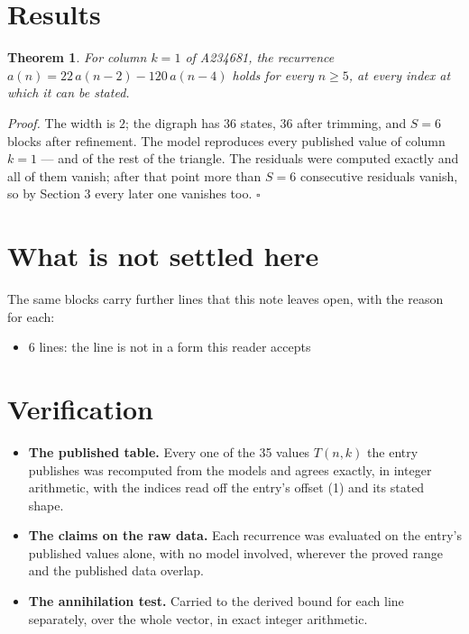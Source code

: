 \documentclass[11pt]{article}
\newtheorem{theorem}{Theorem}
\theoremstyle{definition}
\begin{document}
\section{Results}

\begin{theorem} For column $k = 1$ of A234681, the recurrence $a(n) = 22\,a(n-2) - 120\,a(n-4)$ holds for every $n \ge 5$, at every index at which it can be stated.\end{theorem}

{\itshape Proof.} The width is $2$; the digraph has $36$ states, $36$ after trimming, and $S = 6$ blocks after refinement. The model reproduces every published value of column $k = 1$ --- and of the rest of the triangle. The residuals were computed exactly and all of them vanish; after that point more than $S = 6$ consecutive residuals vanish, so by Section 3 every later one vanishes too. $\square$

\section{What is not settled here}

The same blocks carry further lines that this note leaves open, with the reason for each:

\begin{itemize}

\item 6 lines: the line is not in a form this reader accepts

\end{itemize}

\section{Verification}

\begin{itemize}

\item {\bfseries The published table.} Every one of the 35 values $T(n,k)$ the entry publishes was recomputed from the models and agrees exactly, in integer arithmetic, with the indices read off the entry's offset (1) and its stated shape.

\item {\bfseries The claims on the raw data.} Each recurrence was evaluated on the entry's published values alone, with no model involved, wherever the proved range and the published data overlap.

\item {\bfseries The annihilation test.} Carried to the derived bound for each line separately, over the whole vector, in exact integer arithmetic.

\end{itemize}
\end{document}
